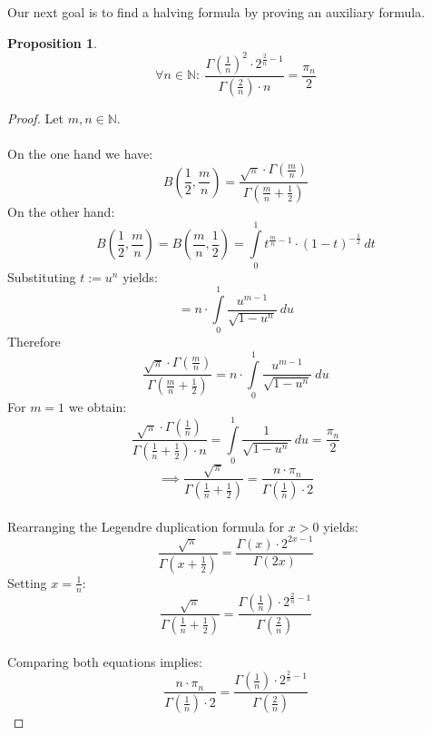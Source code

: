 \documentclass[sn-mathphys]{sn-jnl}%
\theoremstyle{thmstyleone}%
\newtheorem{proposition}[theorem]{Proposition}%
\theoremstyle{thmstyletwo}%
\theoremstyle{thmstylethree}%
\begin{document}
Our next goal is to find a halving formula by proving an auxiliary formula.
\begin{proposition}\label{pr4}
\begin{equation}
\forall n \in \mathbb{N}: \ \frac{\Gamma(\frac{1}{n})^{2} \cdot 2^{\frac{2}{n} - 1}}{\Gamma(\frac{2}{n}) \cdot n} = \frac{\pi_n}{2}
\end{equation}
\end{proposition}
\begin{proof}
Let $m,n \in \mathbb{N}$. \\ \\
On the one hand we have:
\begin{equation*}
B(\frac{1}{2}, \frac{m}{n}) = \frac{\sqrt{\pi} \cdot \Gamma(\frac{m}{n})}{\Gamma(\frac{m}{n} + \frac{1}{2})}
\end{equation*}
On the other hand:
\begin{equation*}
B(\frac{1}{2}, \frac{m}{n}) = B(\frac{m}{n}, \frac{1}{2}) = \int \limits_{0}^{1} t^{\frac{m}{n} - 1} \cdot (1-t)^{- \frac{1}{2}} \ dt
\end{equation*}
Substituting $t := u^n$ yields:
\begin{equation*}
= n \cdot \int \limits_{0}^{1} \frac{u^{m-1}}{\sqrt{1 - u^{n}}} \ du
\end{equation*}
Therefore 
\begin{equation*}
\frac{\sqrt{\pi} \cdot \Gamma(\frac{m}{n})}{\Gamma(\frac{m}{n} + \frac{1}{2})} = n \cdot \int \limits_{0}^{1} \frac{u^{m-1}}{\sqrt{1 - u^{n}}} \ du
\end{equation*}
For $m=1$ we obtain:
\begin{equation*}
\frac{\sqrt{\pi} \cdot \Gamma(\frac{1}{n})}{\Gamma(\frac{1}{n} + \frac{1}{2}) \cdot n} = \int \limits_{0}^{1} \frac{1}{\sqrt{1 - u^{n}}} \ du = \frac{\pi_n}{2}
\end{equation*}
\begin{equation*}
\implies \frac{\sqrt{\pi}}{\Gamma(\frac{1}{n} + \frac{1}{2})} = \frac{n \cdot \pi_n}{\Gamma(\frac{1}{n}) \cdot 2}
\end{equation*} \\
Rearranging the Legendre duplication formula for $x > 0$ yields:
\begin{equation*}
\frac{\sqrt{\pi}}{\Gamma(x + \frac{1}{2})} = \frac{\Gamma(x) \cdot 2^{2x - 1}}{\Gamma(2x)}
\end{equation*}
Setting $x = \frac{1}{n}$:
\begin{equation*}
\frac{\sqrt{\pi}}{\Gamma(\frac{1}{n} + \frac{1}{2})} = \frac{\Gamma(\frac{1}{n}) \cdot 2^{\frac{2}{n} - 1}}{\Gamma(\frac{2}{n})}
\end{equation*} \\
Comparing both equations implies:
\begin{equation*}
\frac{n \cdot \pi_n}{\Gamma(\frac{1}{n}) \cdot 2} = \frac{\Gamma(\frac{1}{n}) \cdot 2^{\frac{2}{n} - 1}}{\Gamma(\frac{2}{n})}
\end{equation*}
\end{proof}
\end{document}
